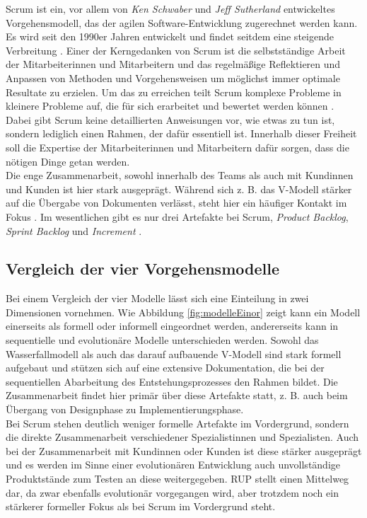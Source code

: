 Scrum ist ein, vor allem von \emph{Ken Schwaber} und \emph{Jeff Sutherland} entwickeltes Vorgehensmodell, das der agilen Software-Entwicklung zugerechnet werden kann. Es wird seit den 1990er Jahren entwickelt und findet seitdem eine steigende Verbreitung \cite[1]{Schwaber:2020:The-Scrum:15} \cite{research:2018:Scrum:67}. Einer der Kerngedanken von Scrum ist die selbstständige Arbeit der Mitarbeiterinnen und Mitarbeitern und das regelmäßige Reflektieren und Anpassen von Methoden und Vorgehensweisen um möglichst immer optimale Resultate zu erzielen. Um das zu erreichen teilt Scrum komplexe Probleme in kleinere Probleme auf, die für sich erarbeitet und bewertet werden können \cite[3]{Schwaber:2020:The-Scrum:15}.
\\
Dabei gibt Scrum keine detaillierten Anweisungen vor, wie etwas zu tun ist, sondern lediglich einen Rahmen, der dafür essentiell ist. Innerhalb dieser Freiheit soll die Expertise der Mitarbeiterinnen und Mitarbeitern dafür sorgen, dass die nötigen Dinge getan werden. \cite{Schwaber:2020:The-Scrum:15}
\\
Die enge Zusammenarbeit, sowohl innerhalb des Teams als auch mit Kundinnen und Kunden ist hier stark ausgeprägt. Während sich z. B. das V-Modell stärker auf die Übergabe von Dokumenten verlässt, steht hier ein häufiger Kontakt im Fokus \cite{Shiklo:2019:8-Vorgehensmodelle:12}.
Im wesentlichen gibt es nur drei Artefakte bei Scrum, \emph{Product Backlog}, \emph{Sprint Backlog} und \emph{Increment} \cite[10-12]{Schwaber:2020:The-Scrum:15}.


\subsection{Vergleich der vier Vorgehensmodelle}

Bei einem Vergleich der vier Modelle lässt sich eine Einteilung in zwei Dimensionen vornehmen. Wie Abbildung \ref{fig:modelleEinor} zeigt kann ein Modell einerseits als formell oder informell eingeordnet werden, andererseits kann in sequentielle und evolutionäre Modelle unterschieden werden. Sowohl das Wasserfallmodell als auch das darauf aufbauende V-Modell sind stark formell aufgebaut und stützen sich auf eine extensive Dokumentation, die bei der sequentiellen Abarbeitung des Entstehungsprozesses den Rahmen bildet. Die Zusammenarbeit findet hier primär über diese Artefakte statt, z. B. auch beim Übergang von Designphase zu Implementierungsphase. 
\\
Bei Scrum stehen deutlich weniger formelle Artefakte im Vordergrund, sondern die direkte Zusammenarbeit verschiedener Spezialistinnen und Spezialisten. Auch bei der Zusammenarbeit mit Kundinnen oder Kunden ist diese stärker ausgeprägt und es werden im Sinne einer evolutionären Entwicklung auch unvollständige Produktstände zum Testen an diese weitergegeben. RUP stellt einen Mittelweg dar, da zwar ebenfalls evolutionär vorgegangen wird, aber trotzdem noch ein stärkerer formeller Fokus als bei Scrum im Vordergrund steht. %

